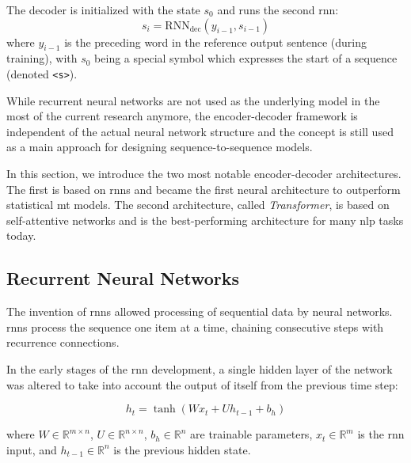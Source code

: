 The decoder is initialized with the state $s_0$ and runs the second \gls{rnn}:
\begin{equation} s_i = \mathrm{RNN}_{\text{dec}}(y_{i-1}, s_{i-1})
\end{equation}
%
where $y_{i-1}$ is the preceding word in the reference output sentence (during
training), with $s_0$ being a special symbol which expresses the start of a
sequence (denoted \texttt{<s>}).

While recurrent neural networks are not used as the underlying model in the most
of the current research anymore, the encoder-decoder framework is independent of
the actual neural network structure and the concept is still used as a main
approach for designing sequence-to-sequence models.

In this section, we introduce the two most notable encoder-decoder
architectures. The first is based on \glspl{rnn} and became the first neural
architecture to outperform statistical \gls{mt} models. The second
architecture, called \emph{Transformer}, is based on self-attentive networks
and is the best-performing architecture for many \gls{nlp} tasks today.


\subsection{Recurrent Neural Networks}
\label{sec:encdec:rnn}

The invention of \glspl{rnn} \citep{elman1990finding} allowed processing of
sequential data by neural networks. \Glspl{rnn} process the sequence one item at
a time, chaining consecutive steps with recurrence connections.

In the early stages of the \gls{rnn} development, a single hidden layer of the
network was altered to take into account the output of itself from the previous
time step:

%

\begin{equation} h_t = \tanh ( W x_t + U h_{t-1} + b_h ) \label{eq:vanilla-rnn}
\end{equation}

\noindent where $W \in \mathbb{R}^{m \times n}$, $U \in \mathbb{R}^{n \times
n}$, $b_h \in \mathbb{R}^{n}$ are trainable parameters, $x_t \in \mathbb{R}^{m}$
is the \gls{rnn} input, and $h_{t-1} \in \mathbb{R}^{n}$ is the previous hidden
state.

